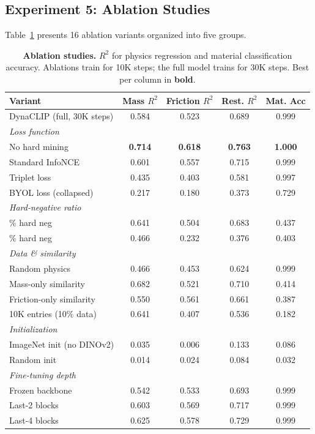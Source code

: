 \documentclass{article}
\newcommand{\methodname}{DynaCLIP}
\newcommand{\best}[1]{\textbf{#1}}
\begin{document}
\subsection{Experiment 5: Ablation Studies}
\label{sec:exp_ablations}

Table~\ref{tab:ablations} presents 16 ablation variants organized into five groups.

\begin{table}[t]
\centering
\caption{\textbf{Ablation studies.} $R^2$ for physics regression and material classification accuracy. Ablations train for 10K steps; the full model trains for 30K steps. Best per column in \best{bold}.}
\label{tab:ablations}
\small
\begin{tabular}{@{}lcccc@{}}
\toprule
\textbf{Variant} & \textbf{Mass $R^2$} & \textbf{Friction $R^2$} & \textbf{Rest. $R^2$} & \textbf{Mat. Acc} \\
\midrule
\methodname{} (full, 30K steps) & 0.584 & 0.523 & 0.689 & 0.999 \\
\midrule
\multicolumn{5}{l}{\emph{Loss function}} \\
\quad No hard mining  & \best{0.714} & \best{0.618} & \best{0.763} & \best{1.000} \\
\quad Standard InfoNCE & 0.601 & 0.557 & 0.715 & 0.999 \\
\quad Triplet loss & 0.435 & 0.403 & 0.581 & 0.997 \\
\quad BYOL loss (collapsed) & 0.217 & 0.180 & 0.373 & 0.729 \\
\midrule
\multicolumn{5}{l}{\emph{Hard-negative ratio}} \\
\quad 15\% hard neg & 0.641 & 0.504 & 0.683 & 0.437 \\
\quad 50\% hard neg  & 0.466 & 0.232 & 0.376 & 0.403 \\
\midrule
\multicolumn{5}{l}{\emph{Data \& similarity}} \\
\quad Random physics & 0.466 & 0.453 & 0.624 & 0.999 \\
\quad Mass-only similarity & 0.682 & 0.521 & 0.710 & 0.414 \\
\quad Friction-only similarity & 0.550 & 0.561 & 0.661 & 0.387 \\
\quad 10K entries (10\% data) & 0.641 & 0.407 & 0.536 & 0.182 \\
\midrule
\multicolumn{5}{l}{\emph{Initialization}} \\
\quad ImageNet init (no DINOv2) & 0.035 & 0.006 & 0.133 & 0.086 \\
\quad Random init & 0.014 & 0.024 & 0.084 & 0.032 \\
\midrule
\multicolumn{5}{l}{\emph{Fine-tuning depth}} \\
\quad Frozen backbone & 0.542 & 0.533 & 0.693 & 0.999 \\
\quad Last-2 blocks & 0.603 & 0.569 & 0.717 & 0.999 \\
\quad Last-4 blocks & 0.625 & 0.578 & 0.729 & 0.999 \\
\bottomrule
\end{tabular}
\end{table}
\end{document}

